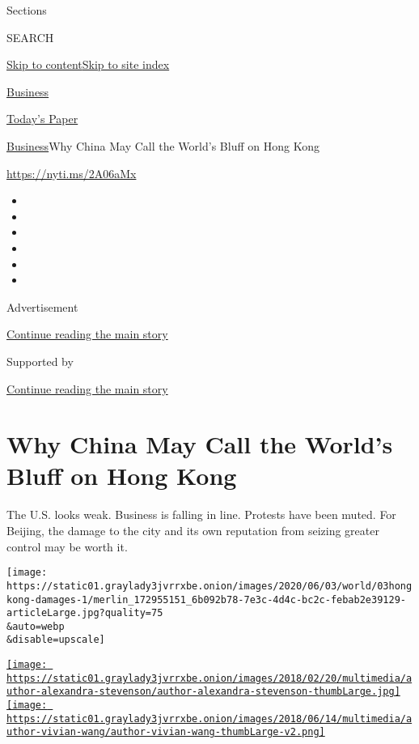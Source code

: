 Sections

SEARCH

\protect\hyperlink{site-content}{Skip to
content}\protect\hyperlink{site-index}{Skip to site index}

\href{https://www.nytimes3xbfgragh.onion/section/business}{Business}

\href{https://myaccount.nytimes3xbfgragh.onion/auth/login?response_type=cookie\&client_id=vi}{}

\href{https://www.nytimes3xbfgragh.onion/section/todayspaper}{Today's
Paper}

\href{/section/business}{Business}\textbar{}Why China May Call the
World's Bluff on Hong Kong

\url{https://nyti.ms/2A06aMx}

\begin{itemize}
\item
\item
\item
\item
\item
\item
\end{itemize}

Advertisement

\protect\hyperlink{after-top}{Continue reading the main story}

Supported by

\protect\hyperlink{after-sponsor}{Continue reading the main story}

\hypertarget{why-china-may-call-the-worlds-bluff-on-hong-kong}{%
\section{Why China May Call the World's Bluff on Hong
Kong}\label{why-china-may-call-the-worlds-bluff-on-hong-kong}}

The U.S. looks weak. Business is falling in line. Protests have been
muted. For Beijing, the damage to the city and its own reputation from
seizing greater control may be worth it.

\texttt{[image: https://static01.graylady3jvrrxbe.onion/images/2020/06/03/world/03hongkong-damages-1/merlin\_172955151\_6b092b78-7e3c-4d4c-bc2c-febab2e39129-articleLarge.jpg?quality=75\\\&auto=webp\\\&disable=upscale]}

\href{https://www.nytimes3xbfgragh.onion/by/alexandra-stevenson}{\texttt{[image: https://static01.graylady3jvrrxbe.onion/images/2018/02/20/multimedia/author-alexandra-stevenson/author-alexandra-stevenson-thumbLarge.jpg]}}\href{https://www.nytimes3xbfgragh.onion/by/vivian-wang}{\texttt{[image: https://static01.graylady3jvrrxbe.onion/images/2018/06/14/multimedia/author-vivian-wang/author-vivian-wang-thumbLarge-v2.png]}}

